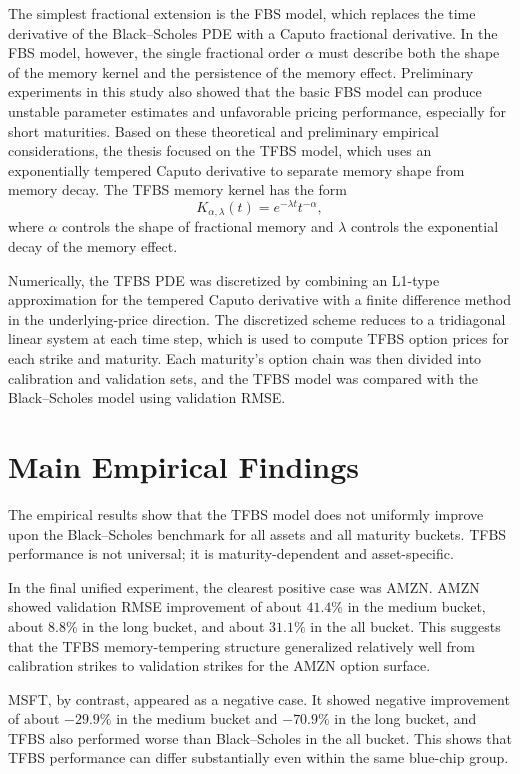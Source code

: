 \documentclass[11pt,a4paper]{report}
\begin{document}
The simplest fractional extension is the FBS model, which replaces the time derivative of the Black--Scholes PDE with a Caputo fractional derivative. In the FBS model, however, the single fractional order $\alpha$ must describe both the shape of the memory kernel and the persistence of the memory effect. Preliminary experiments in this study also showed that the basic FBS model can produce unstable parameter estimates and unfavorable pricing performance, especially for short maturities. Based on these theoretical and preliminary empirical considerations, the thesis focused on the TFBS model, which uses an exponentially tempered Caputo derivative to separate memory shape from memory decay. The TFBS memory kernel has the form
\[
K_{\alpha,\lambda}(t)
=
e^{-\lambda t}t^{-\alpha},
\]
where $\alpha$ controls the shape of fractional memory and $\lambda$ controls the exponential decay of the memory effect.

Numerically, the TFBS PDE was discretized by combining an L1-type approximation for the tempered Caputo derivative with a finite difference method in the underlying-price direction. The discretized scheme reduces to a tridiagonal linear system at each time step, which is used to compute TFBS option prices for each strike and maturity. Each maturity's option chain was then divided into calibration and validation sets, and the TFBS model was compared with the Black--Scholes model using validation RMSE.

\section{Main Empirical Findings}

The empirical results show that the TFBS model does not uniformly improve upon the Black--Scholes benchmark for all assets and all maturity buckets. TFBS performance is not universal; it is maturity-dependent and asset-specific.

In the final unified experiment, the clearest positive case was AMZN. AMZN showed validation RMSE improvement of about $41.4\%$ in the medium bucket, about $8.8\%$ in the long bucket, and about $31.1\%$ in the all bucket. This suggests that the TFBS memory-tempering structure generalized relatively well from calibration strikes to validation strikes for the AMZN option surface.

MSFT, by contrast, appeared as a negative case. It showed negative improvement of about $-29.9\%$ in the medium bucket and $-70.9\%$ in the long bucket, and TFBS also performed worse than Black--Scholes in the all bucket. This shows that TFBS performance can differ substantially even within the same blue-chip group.
\end{document}
